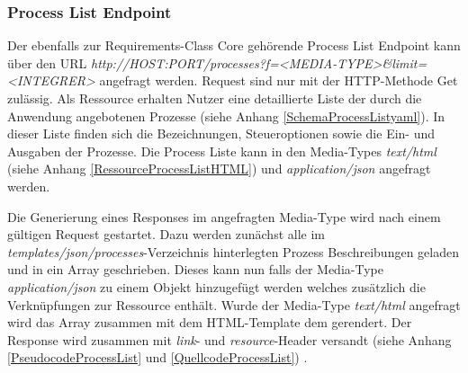 \subsubsection{Process List Endpoint}
Der ebenfalls zur Requirements-Class Core gehörende Process List Endpoint kann über den URL \textit{http://HOST:PORT/processes?f=<MEDIA-TYPE>\&limit=<INTEGRER>} 
angefragt werden. 
Request sind nur mit der HTTP-Methode Get zulässig. Als Ressource erhalten Nutzer eine detaillierte Liste der durch die Anwendung angebotenen 
Prozesse (siehe Anhang \ref{SchemaProcessListyaml}). In dieser Liste finden sich die Bezeichnungen, 
Steueroptionen sowie die Ein- und Ausgaben der Prozesse. Die Process Liste kann in den Media-Types \textit{text/html} (siehe Anhang \ref{RessourceProcessListHTML}) 
und \textit{application/json} angefragt werden. 

Die Generierung eines Responses im angefragten Media-Type wird nach einem gültigen Request gestartet. 
Dazu werden zunächst alle im \textit{templates/json/processes}-Verzeichnis hinterlegten Prozess Beschreibungen geladen und in ein Array geschrieben. 
Dieses kann nun falls der Media-Type \textit{application/json} zu einem Objekt hinzugefügt werden welches zusätzlich die Verknüpfungen zur Ressource enthält. 
Wurde der Media-Type \textit{text/html} angefragt wird das Array zusammen mit dem HTML-Template dem gerendert. 
Der Response wird zusammen mit \textit{link}- und \textit{resource}-Header versandt (siehe Anhang \ref{PseudocodeProcessList} und \ref{QuellcodeProcessList}) 
\cite{ogc_api_processes_core}.

